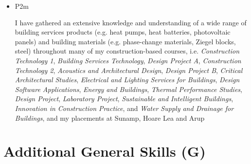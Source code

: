 \begin{itemize}
    \item P2m
    
    I have gathered an extensive knowledge and understanding of a wide range of building services products (e.g. heat pumps, heat batteries, photovoltaic panels) and building materials (e.g. phase-change materials, Ziegel blocks, steel)
    throughout many of my construction-based courses, i.e. 
    \textit{Construction Technology 1},
    \textit{Building Services Technology},
    \textit{Design Project A},
    \textit{Construction Technology 2},
    \textit{Acoustics and Architectural Design},
    \textit{Design Project B},
    \textit{Critical Architectural Studies},
    \textit{Electrical and Lighting Services for Buildings},
    \textit{Design Software Applications},
    \textit{Energy and Buildings},
    \textit{Thermal Performance Studies},
    \textit{Design Project},
    \textit{Laboratory Project},
    \textit{Sustainable and Intelligent Buildings},
    \textit{Innovation in Construction Practice},
    and \textit{Water Supply and Drainage for Buildings},
    and my placements at Sunamp, Hoare Lea and Arup
\end{itemize}










\section{Additional General Skills (G)}